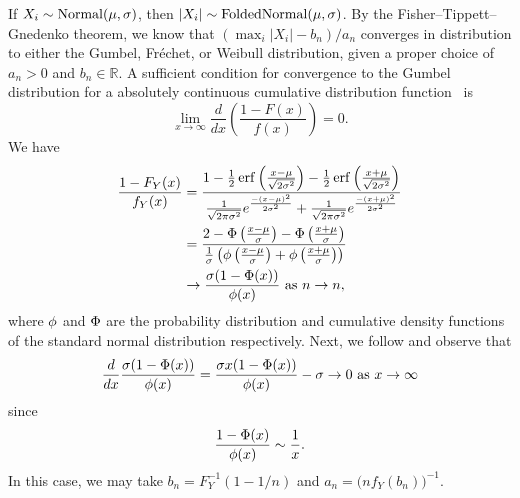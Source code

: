 If \(X_i \sim \operatorname{Normal}(\mu, \sigma)\), then \(|X_i| \sim \operatorname{FoldedNormal}(\mu,\sigma)\). By the
Fisher--Tippett--Gnedenko theorem, we know that \((\max_i |X_i| - b_n) / a_n\) converges in
distribution to either the Gumbel, Fréchet, or Weibull distribution, given a proper choice
of \(a_n > 0\) and \(b_n \in \mathbb{R}\). A sufficient condition for convergence to the
Gumbel distribution for a absolutely continuous cumulative distribution
function~\citep[Theorem 10.5.2]{nagaraja2003} is
\[
  \lim_{x \rightarrow \infty} \frac{d}{dx}\left(\frac{1- F(x)}{f(x)}\right) = 0.
\]
We have
\[
  \begin{aligned}
    \frac{1 - F_Y(x)}{f_Y(x)} & = \frac{1 - \frac{1}{2}\operatorname{erf}{\left(\frac{x - \mu}{\sqrt{2\sigma^2}}\right)} - \frac{1}{2}\operatorname{erf}{\left(\frac{x + \mu}{\sqrt{2\sigma^2}}\right)}}{\frac{1}{\sqrt{2\pi\sigma^2}}e^{\frac{-(x-\mu)^2}{2\sigma^2}} + \frac{1}{\sqrt{2\pi\sigma^2}}e^{\frac{-(x+\mu)^2}{2\sigma^2}}} \\
                              & = \frac{2 - \operatorname{\Phi}\left(\frac{x - \mu}{\sigma}\right) - \operatorname{\Phi}\left(\frac{x + \mu}{\sigma}\right)}{\frac{1}{\sigma}\left(\operatorname{\phi}\left(\frac{x - \mu}{\sigma}\right) + \operatorname{\phi}\left(\frac{x + \mu}{\sigma}\right)\right)}                                                              \\
                              & \rightarrow \frac{\sigma(1 - \operatorname{\Phi}(x))}{\operatorname{\phi}(x)} \text{ as } n \rightarrow n,
  \end{aligned}
\]
where \(\operatorname{\phi}\) and \(\operatorname{\Phi}\) are the probability distribution and cumulative density
functions of the standard normal distribution respectively. Next, we follow \citet[example
  10.5.3]{nagaraja2003} and observe that
\[
  \frac{d}{dx} \frac{\sigma(1 - \operatorname{\Phi}(x))}{\operatorname{\phi}(x)} = \frac{\sigma x (1 - \operatorname{\Phi}(x))}{\operatorname{\phi}(x)} - \sigma \rightarrow 0 \text{ as } x \rightarrow \infty
\]
since
\[
  \frac{1 - \operatorname{\Phi}(x)}{\operatorname{\phi}(x)} \sim \frac{1}{x}.
\]
In this case, we may take \(b_n = F_Y^{-1}(1 - 1/n)\) and \(a_n = \big(n
f_Y(b_n)\big)^{-1}\).

